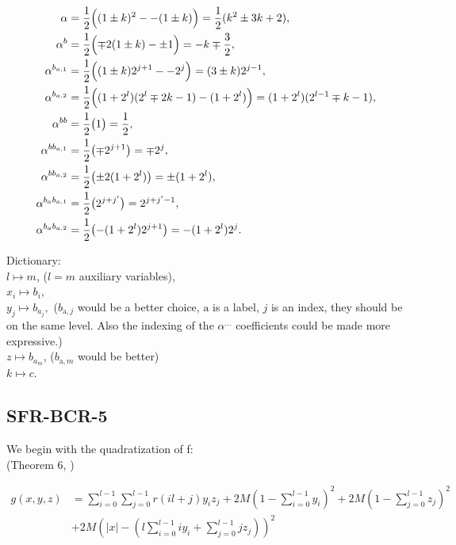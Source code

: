 \documentclass[a4paper,english,notitlepage,longbibliography,showpacs,preprintnumbers,amsmath,amssymb,aps,prx,nofootinbib,12pt,superscriptaddress]{revtex4-1}
\begin{document}
\begin{subequations}
\label{eq:BCR34alpha}
\begin{align}
\alpha &=\frac12\Bigl((1\pm k)^2--(1\pm k) \Bigr)= \frac12(k^2\pm3k+2), \\
%
\alpha^{b} &= \frac12\Bigl(\mp 2(1\pm k)-\pm1\Bigr)= -k\mp\frac32, \\
\alpha^{b_{a,1}} &= \frac12\Bigl((1\pm k)2^{j+1}--2^j\Bigr)= (3\pm k)2^{j-1}, \\
\alpha^{b_{a,2}} &= \frac12\Bigl((1+2^l)(2^l\mp2k-1)-(1+2^l)\Bigr)= (1+2^l)(2^{l-1}\mp k-1), \\
%
\alpha^{bb} &= \frac12\bigl(1\bigr)= \frac12, \\
\alpha^{bb_{a,1}} &= \frac12\bigl(\mp2^{j+1}\bigr)= \mp2^j, \\
\alpha^{bb_{a,2}} &= \frac12\bigl(\pm2(1+2^l)\bigr)= \pm(1+2^l), \\
\alpha^{b_ab_{a,1}} &= \frac12\bigl(2^{j+j'}\bigr)= 2^{j+j'-1}, \\
\alpha^{b_ab_{a,2}} &= \frac12\bigl(-(1+2^l)2^{j+1}\bigr)= -(1+2^l)2^{j}.
\end{align}
\end{subequations}

Dictionary: \\
$l\mapsto m$, ($l=m$ auxiliary variables),\\
$x_i\mapsto b_i$, \\
$y_j\mapsto b_{a_j},$
($b_{\text{a},j}$ would be a better choice, $\text{a}$ is a label, $j$ is an index, they should be on the same level.
Also the indexing of the $\alpha^{\dots}$ coefficients could be made more expressive.)\\
$z\mapsto b_{a_m}$, ($b_{\text{a},m}$ would be better)\\
$k\mapsto c$.



\subsection{SFR-BCR-5}

We begin with the quadratization of f:
\\(Theorem 6, \cite{Boros2018boundsPaper})

\begin{equation}
  \begin{split}
  \left.
  g(x,y,z)
  \right.
  &= \sum_{i=0}^{l-1}\sum_{j=0}^{l-1}r(il+j)y_iz_j
  + 2M\left(1-\sum_{i=0}^{l-1}y_i\right)^2 + 2M\left(1-\sum_{j=0}^{l-1}z_j\right)^2\\
  &+ 2M\left(|x| - \left(l\sum_{i=0}^{l-1}iy_i + \sum_{j=0}^{l-1}jz_j\right)\right)^2
  \end{split}
\end{equation}
\end{document}
